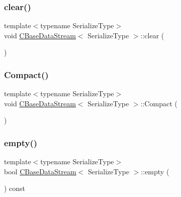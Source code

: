 \subsubsection{\texorpdfstring{clear()}{clear()}}
{\footnotesize\ttfamily template$<$typename Serialize\+Type$>$ \\
void \mbox{\hyperlink{class_c_base_data_stream}{C\+Base\+Data\+Stream}}$<$ Serialize\+Type $>$\+::clear (\begin{DoxyParamCaption}{ }\end{DoxyParamCaption})\hspace{0.3cm}{\ttfamily [inline]}}

\mbox{\label{class_c_base_data_stream_ab52dd7b6e1dce1fd90e1c9f9ad729ee6}} 
\subsubsection{\texorpdfstring{Compact()}{Compact()}}
{\footnotesize\ttfamily template$<$typename Serialize\+Type$>$ \\
void \mbox{\hyperlink{class_c_base_data_stream}{C\+Base\+Data\+Stream}}$<$ Serialize\+Type $>$\+::Compact (\begin{DoxyParamCaption}{ }\end{DoxyParamCaption})\hspace{0.3cm}{\ttfamily [inline]}}

\mbox{\label{class_c_base_data_stream_ac2a82d5383c034f844b70a67ed580806}} 
\subsubsection{\texorpdfstring{empty()}{empty()}}
{\footnotesize\ttfamily template$<$typename Serialize\+Type$>$ \\
bool \mbox{\hyperlink{class_c_base_data_stream}{C\+Base\+Data\+Stream}}$<$ Serialize\+Type $>$\+::empty (\begin{DoxyParamCaption}{ }\end{DoxyParamCaption}) const\hspace{0.3cm}{\ttfamily [inline]}}

\mbox{\label{class_c_base_data_stream_a7d083ceebeb6f4ea63d2434f8b11a292}} 
